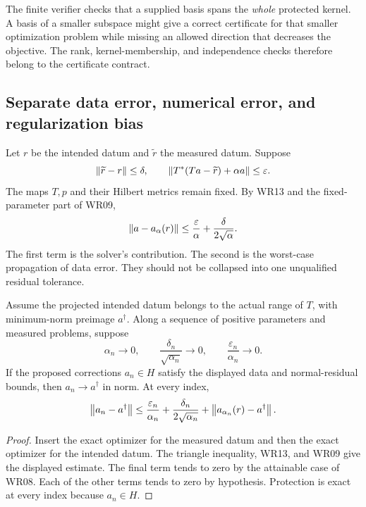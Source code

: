 
The finite verifier checks that a supplied basis spans the \emph{whole} protected kernel. A basis of a smaller subspace might give a correct certificate for that smaller optimization problem while missing an allowed direction that decreases the objective. The rank, kernel-membership, and independence checks therefore belong to the certificate contract.

\subsection{Separate data error, numerical error, and regularization bias}
Let $r$ be the intended datum and $\widetilde r$ the measured datum. Suppose
\[
 \left\lVert\widetilde r-r\right\rVert\le\delta,
 \qquad \left\lVert T^*(Ta-\widetilde r)+\alpha a\right\rVert\le\varepsilon.
\]
The maps $T,p$ and their Hilbert metrics remain fixed. By WR13 and the fixed-parameter part of WR09,
\begin{equation}\label{eq:combined-solver-data}
 \left\lVert a-a_\alpha(r)\right\rVert
 \le \frac{\varepsilon}{\alpha}+\frac{\delta}{2\sqrt\alpha}.
\end{equation}
The first term is the solver's contribution. The second is the worst-case propagation of data error. They should not be collapsed into one unqualified residual tolerance.

\begin{theorem}\label{WR16}
Assume the projected intended datum belongs to the actual range of $T$, with minimum-norm preimage $a^\dagger$. Along a sequence of positive parameters and measured problems, suppose
\[
 \alpha_n\to0,\qquad
 \frac{\delta_n}{\sqrt{\alpha_n}}\to0,\qquad
 \frac{\varepsilon_n}{\alpha_n}\to0.
\]
If the proposed corrections $a_n\in H$ satisfy the displayed data and normal-residual bounds, then $a_n\to a^\dagger$ in norm. At every index,
\[
 \left\lVert a_n-a^\dagger\right\rVert
 \le\frac{\varepsilon_n}{\alpha_n}
      +\frac{\delta_n}{2\sqrt{\alpha_n}}
      +\left\lVert a_{\alpha_n}(r)-a^\dagger\right\rVert.
\]
\end{theorem}
\begin{proof}
Insert the exact optimizer for the measured datum and then the exact optimizer for the intended datum. The triangle inequality, WR13, and WR09 give the displayed estimate. The final term tends to zero by the attainable case of WR08. Each of the other terms tends to zero by hypothesis. Protection is exact at every index because $a_n\in H$.
\end{proof}

